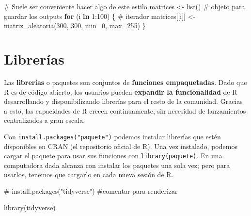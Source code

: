 \documentclass[
  letterpaper,
  DIV=11,
  numbers=noendperiod]{scrartcl}
\newenvironment{Shaded}{\begin{snugshade}}{\end{snugshade}}
\newcommand{\AttributeTok}[1]{\textcolor[rgb]{0.40,0.45,0.13}{#1}}
\newcommand{\CommentTok}[1]{\textcolor[rgb]{0.37,0.37,0.37}{#1}}
\newcommand{\ControlFlowTok}[1]{\textcolor[rgb]{0.00,0.23,0.31}{\textbf{#1}}}
\newcommand{\DecValTok}[1]{\textcolor[rgb]{0.68,0.00,0.00}{#1}}
\newcommand{\FunctionTok}[1]{\textcolor[rgb]{0.28,0.35,0.67}{#1}}
\newcommand{\NormalTok}[1]{\textcolor[rgb]{0.00,0.23,0.31}{#1}}
\newcommand{\OtherTok}[1]{\textcolor[rgb]{0.00,0.23,0.31}{#1}}
\newcommand{\SpecialCharTok}[1]{\textcolor[rgb]{0.37,0.37,0.37}{#1}}
\begin{document}
\begin{Shaded}
\begin{Highlighting}[]
\CommentTok{\# Suele ser conveniente hacer algo de este estilo}
\NormalTok{matrices }\OtherTok{\textless{}{-}} \FunctionTok{list}\NormalTok{() }
\CommentTok{\# objeto para guardar los outputs }
\ControlFlowTok{for}\NormalTok{ (i }\ControlFlowTok{in} \DecValTok{1}\SpecialCharTok{:}\DecValTok{100}\NormalTok{) \{ }
  \CommentTok{\# iterador     }
\NormalTok{  matrices[[i]] }\OtherTok{\textless{}{-}} \FunctionTok{matriz\_aleatoria}\NormalTok{(}\DecValTok{300}\NormalTok{, }\DecValTok{300}\NormalTok{, }\AttributeTok{min=}\DecValTok{0}\NormalTok{, }\AttributeTok{max=}\DecValTok{255}\NormalTok{) }
\NormalTok{\}}
\end{Highlighting}
\end{Shaded}

\section{Librerías}\label{libreruxedas}

Las \textbf{librerías} o paquetes son conjuntos de \textbf{funciones
empaquetadas}. Dado que R es de código abierto, los usuarios pueden
\textbf{expandir la funcionalidad} de R desarrollando y disponibilizando
librerías para el resto de la comunidad. Gracias a esto, las capacidades
de R crecen continuamente, sin necesidad de lanzamientos centralizados a
gran escala.

Con \texttt{install.packages("paquete")} podemos instalar librerías que
estén disponibles en CRAN (el repositorio oficial de R). Una vez
instalado, podemos cargar el paquete para usar sus funciones con
\texttt{library(paquete)}. En una computadora dada alcanza con instalar
los paquetes una sola vez; pero para usarlos, tenemos que cargarlo en
cada nueva sesión de R.

\begin{Shaded}
\begin{Highlighting}[]
\CommentTok{\# install.packages("tidyverse") \#comentar para renderizar}
\end{Highlighting}
\end{Shaded}

\begin{Shaded}
\begin{Highlighting}[]
\FunctionTok{library}\NormalTok{(tidyverse)}
\end{Highlighting}
\end{Shaded}
\end{document}
